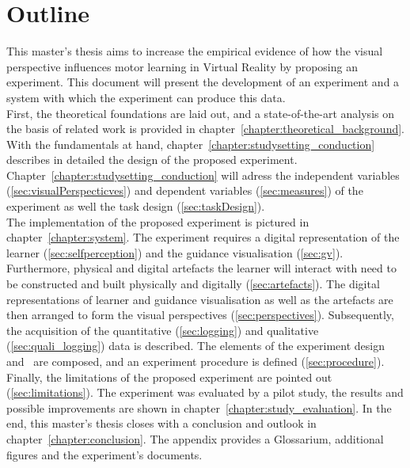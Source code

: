 \section{Outline}
This master's thesis aims to increase the empirical evidence of how the visual perspective influences motor learning in Virtual Reality by proposing an experiment. This document will present the development of an experiment and a system with which the experiment can produce this data.\\
First, the theoretical foundations are laid out, and a state-of-the-art analysis on the basis of related work is provided in chapter~\ref{chapter:theoretical_background}. With the fundamentals at hand, chapter~\ref{chapter:studysetting_conduction} describes in detailed the design of the proposed experiment. Chapter~\ref{chapter:studysetting_conduction} will adress the independent variables (\ref{sec:visualPerspecticves}) and dependent variables (\ref{sec:measures}) of the experiment as well the task design (\ref{sec:taskDesign}).\\
The implementation of the proposed experiment is pictured in chapter~\ref{chapter:system}. The experiment requires a digital representation of the learner (\ref{sec:selfperception}) and the guidance visualisation (\ref{sec:gv}). Furthermore, physical and digital artefacts the learner will interact with need to be constructed and built physically and digitally (\ref{sec:artefacts}). The digital representations of learner and guidance visualisation as well as the artefacts are then arranged to form the visual perspectives (\ref{sec:perspectives}). Subsequently, the acquisition of the quantitative (\ref{sec:logging}) and qualitative (\ref{sec:quali_logging}) data is described. The elements of the experiment design and \exgo\ are composed, and an experiment procedure is defined (\ref{sec:procedure}). Finally, the limitations of the proposed experiment are pointed out (\ref{sec:limitations}). The experiment was evaluated by a pilot study, the results and possible improvements are shown in chapter~\ref{chapter:study_evaluation}. In the end, this master's thesis closes with a conclusion and outlook in chapter~\ref{chapter:conclusion}. The appendix provides a Glossarium, additional figures and the experiment's documents.




